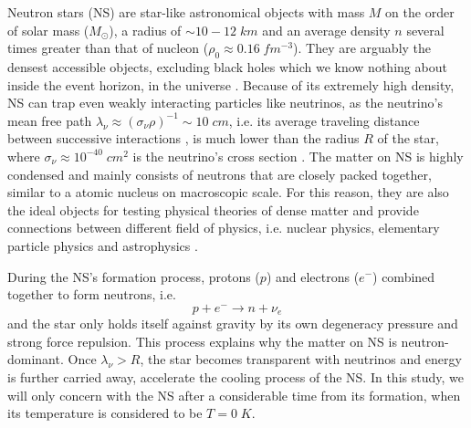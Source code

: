 
Neutron stars (\gls{NS}) are star-like astronomical objects with mass $M$ on the order of solar mass ($M_\odot$), a radius of $\sim 10-12\;km$ and an average density $n$ several times greater than that of nucleon ($\rho_0 \approx 0.16\;fm^{-3}$). They are arguably the densest accessible objects, excluding black holes which we know nothing about inside the event horizon, in the universe \cite{baym1975neutron}. Because of its extremely high density, \gls{NS} can trap even weakly interacting particles like neutrinos, as the neutrino's mean free path $\lambda_\nu\approx (\sigma_\nu\rho)^{-1}\sim 10\;cm$, i.e. its average traveling distance between successive interactions \cite{brunglinghaus2011mean}, is much lower than the radius $R$ of the star, where $\sigma_\nu\approx 10^{-40}\;cm^{2}$ is the neutrino's cross section \cite{formaggio2012ev}. The matter on \gls{NS} is highly condensed and mainly consists of neutrons that are closely packed together, similar to a atomic nucleus on macroscopic scale. For this reason, they are also the ideal objects for testing physical theories of dense matter and provide connections between different field of physics, i.e. nuclear physics, elementary particle physics and astrophysics \cite{lattimer2004physics}.\par
During the \gls{NS}'s formation process, protons ($p$) and electrons ($e^-$) combined together to form neutrons, i.e.
\begin{equation}
        p + e^- \longrightarrow n + \nu_e
\end{equation}
and the star only holds itself against gravity by its own degeneracy pressure and strong force repulsion. This process explains why the matter on \gls{NS} is neutron-dominant. Once $\lambda_\nu > R$, the star becomes transparent with neutrinos and energy is further carried away, accelerate the cooling process of the \gls{NS}. In this study, we will only concern with the \gls{NS} after a considerable time from its formation, when its temperature is considered to be $T=0\;K$.\par
